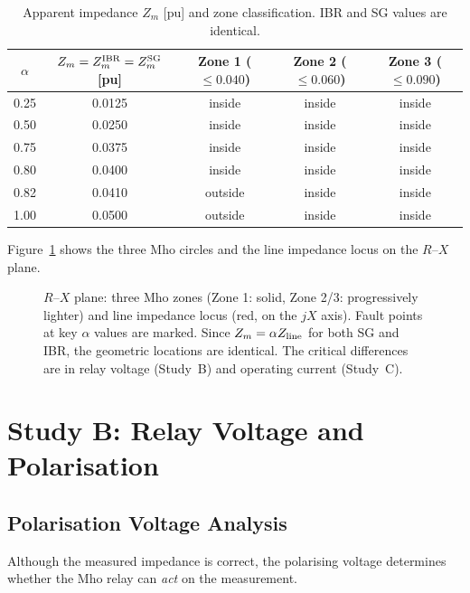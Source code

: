 \documentclass[11pt,a4paper]{article}
\begin{document}
\begin{table}[h!]
\centering
\caption{Apparent impedance $Z_m$ [pu] and zone classification.
         IBR and SG values are identical.}
\label{tab:zm}
\begin{tabular}{ccccc}
\toprule
$\alpha$ & $Z_m = Z_m^{\rm IBR} = Z_m^{\rm SG}$ [pu]
         & Zone 1 ($\leq 0.040$) & Zone 2 ($\leq 0.060$) & Zone 3 ($\leq 0.090$) \\
\midrule
0.25 & 0.0125 & inside  & inside  & inside \\
0.50 & 0.0250 & inside  & inside  & inside \\
0.75 & 0.0375 & inside  & inside  & inside \\
0.80 & 0.0400 & inside  & inside  & inside \\
0.82 & 0.0410 & outside & inside  & inside \\
1.00 & 0.0500 & outside & inside  & inside \\
\bottomrule
\end{tabular}
\end{table}

Figure~\ref{fig:rxplane} shows the three Mho circles and the line
impedance locus on the $R$--$X$ plane.

\begin{figure}[h!]
  \centering
  
  \caption{$R$--$X$ plane: three Mho zones (Zone 1: solid, Zone 2/3:
           progressively lighter) and line impedance locus (red, on the
           $jX$ axis).  Fault points at key $\alpha$ values are marked.
           Since $Z_m = \alpha Z_{\rm line}$ for both SG and IBR, the
           geometric locations are identical.  The critical differences
           are in relay voltage (Study~B) and operating current (Study~C).}
  \label{fig:rxplane}
\end{figure}

\section{Study B: Relay Voltage and Polarisation}

\subsection{Polarisation Voltage Analysis}

Although the measured impedance is correct, the polarising voltage
determines whether the Mho relay can \emph{act} on the measurement.
\end{document}

